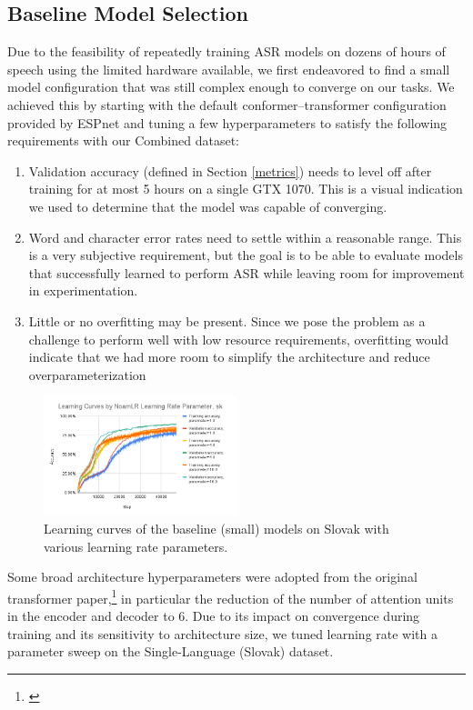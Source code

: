 \documentclass{article}
\begin{document}
  \subsection{Baseline Model Selection} \label{baseline-model-selection}
  Due to the feasibility of repeatedly training ASR models on dozens of hours of speech using the limited hardware available, we first endeavored to find a small model configuration that was still complex enough to converge on our tasks. We achieved this by starting with the default conformer--transformer configuration provided by ESPnet and tuning a few hyperparameters to satisfy the following requirements with our Combined dataset:
  \begin{enumerate}
    \item Validation accuracy (defined in Section \ref{metrics}) needs to level off after training for at most 5 hours on a single GTX 1070. This is a visual indication we used to determine that the model was capable of converging.
    \item Word and character error rates need to settle within a reasonable range. This is a very subjective requirement, but the goal is to be able to evaluate models that successfully learned to perform ASR while leaving room for improvement in experimentation.
    \item Little or no overfitting may be present. Since we pose the problem as a challenge to perform well with low resource requirements, overfitting would indicate that we had more room to simplify the architecture and reduce overparameterization
  \end{enumerate}
  \begin{figure}
    \includegraphics[width=0.5\textwidth]{images/learning-learning-rate}
    \caption{Learning curves of the baseline (small) models on Slovak with various learning rate parameters.}
  \end{figure}
  Some broad architecture hyperparameters were adopted from the original transformer paper,\footnote{\cite{Vaswani}} in particular the reduction of the number of attention units in the encoder and decoder to 6. Due to its impact on convergence during training and its sensitivity to architecture size, we tuned learning rate with a parameter sweep on the Single-Language (Slovak) dataset.
\end{document}
